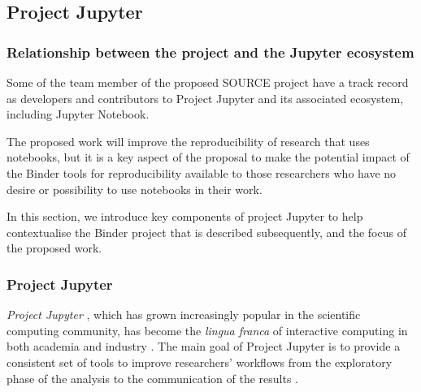 \subsection{Project Jupyter}
\label{sec:project-jupyter}


\subsubsection{Relationship between the \TheProject{} project and the Jupyter ecosystem}

Some of the team member of the proposed SOURCE project have a track record as
developers and contributors to Project Jupyter and its associated
ecosystem, including Jupyter Notebook.

The proposed work will improve the reproducibility of research that uses
notebooks, but it is a key aspect of the proposal to make the potential
impact of the Binder tools for reproducibility available to those researchers
who have no desire or possibility to use notebooks in their work.

In this section, we introduce key components of project Jupyter to help
contextualise the Binder project that is described subsequently, and the focus
of the proposed work.




\subsubsection{Project Jupyter}\label{seq:project-jupyter-number-notebooks}

\emph{Project Jupyter} \cite{Jupyter}, which has grown increasingly popular in the scientific
computing community, has become the \emph{lingua franca} of interactive
computing in both academia and industry \cite{Perkel2018}. The main goal of Project Jupyter
is to provide a consistent set of tools to improve researchers'
workflows from the exploratory phase of the analysis to the communication
of the results \cite{Kluyver2016,Granger2021}.

